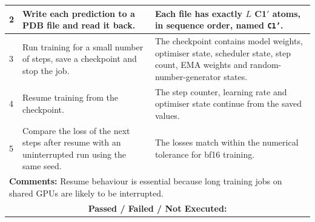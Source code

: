 \documentclass{FastFyp}
\begin{document}
{\begin{longtable}{|p{2.4cm}|p{4.6cm}|p{2.4cm}|p{3.8cm}|}
2 & Write each prediction to a PDB file and read it back. & \multicolumn{2}{p{6.64cm}|}{Each file has exactly $L$ C1$'$ atoms, in sequence order, named \texttt{C1'}.} \\ \hline
3 & Run training for a small number of steps, save a checkpoint and stop the job. & \multicolumn{2}{p{6.64cm}|}{The checkpoint contains model weights, optimiser state, scheduler state, step count, EMA weights and random-number-generator states.} \\ \hline
4 & Resume training from the checkpoint. & \multicolumn{2}{p{6.64cm}|}{The step counter, learning rate and optimiser state continue from the saved values.} \\ \hline
5 & Compare the loss of the next steps after resume with an uninterrupted run using the same seed. & \multicolumn{2}{p{6.64cm}|}{The losses match within the numerical tolerance for bf16 training.} \\ \hline
\multicolumn{4}{|p{14.51cm}|}{\textbf{Comments:} Resume behaviour is essential because long training jobs on shared GPUs are likely to be interrupted.} \\ \hline
\multicolumn{4}{|c|}{\textbf{Passed / Failed / Not Executed:}} \\ \hline
\end{longtable}
}
\end{document}

